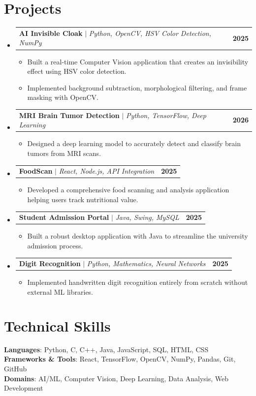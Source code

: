 \documentclass[letterpaper,11pt]{article}
\makeatletter
\newcommand{\resumeItem}[1]{
  \item\small{
    {#1 \vspace{-2pt}}
  }
}
\newcommand{\resumeProjectHeading}[2]{
    \item
    \begin{tabular*}{1.0\textwidth}{l@{\extracolsep{\fill}}r}
      \small#1 & \textbf{\small #2} \\
    \end{tabular*}\vspace{-7pt}
}
\newcommand{\resumeSubHeadingListStart}{\begin{itemize}[leftmargin=0.0in, label={}]}
\newcommand{\resumeSubHeadingListEnd}{\end{itemize}}
\newcommand{\resumeItemListStart}{\begin{itemize}}
\newcommand{\resumeItemListEnd}{\end{itemize}\vspace{-5pt}}
\makeatother
\begin{document}
\section{Projects}
    \resumeSubHeadingListStart
      \resumeProjectHeading
          {\textbf{AI Invisible Cloak} $|$ \emph{Python, OpenCV, HSV Color Detection, NumPy}}{2025}
          \resumeItemListStart
            \resumeItem{Built a real-time Computer Vision application that creates an invisibility effect using HSV color detection.}
            \resumeItem{Implemented background subtraction, morphological filtering, and frame masking with OpenCV.}
          \resumeItemListEnd
      \resumeProjectHeading
          {\textbf{MRI Brain Tumor Detection} $|$ \emph{Python, TensorFlow, Deep Learning}}{2026}
          \resumeItemListStart
            \resumeItem{Designed a deep learning model to accurately detect and classify brain tumors from MRI scans.}
          \resumeItemListEnd
      \resumeProjectHeading
          {\textbf{FoodScan} $|$ \emph{React, Node.js, API Integration}}{2025}
          \resumeItemListStart
            \resumeItem{Developed a comprehensive food scanning and analysis application helping users track nutritional value.}
          \resumeItemListEnd
      \resumeProjectHeading
          {\textbf{Student Admission Portal} $|$ \emph{Java, Swing, MySQL}}{2025}
          \resumeItemListStart
            \resumeItem{Built a robust desktop application with Java to streamline the university admission process.}
          \resumeItemListEnd
      \resumeProjectHeading
          {\textbf{Digit Recognition} $|$ \emph{Python, Mathematics, Neural Networks}}{2025}
          \resumeItemListStart
            \resumeItem{Implemented handwritten digit recognition entirely from scratch without external ML libraries.}
          \resumeItemListEnd
    \resumeSubHeadingListEnd


\section{Technical Skills}
 \begin{itemize}[leftmargin=0.15in, label={}]
    \small{\item{
     \textbf{Languages}{: Python, C, C++, Java, JavaScript, SQL, HTML, CSS} \\
     \textbf{Frameworks \& Tools}{: React, TensorFlow, OpenCV, NumPy, Pandas, Git, GitHub} \\
     \textbf{Domains}{: AI/ML, Computer Vision, Deep Learning, Data Analysis, Web Development}
    }}
 \end{itemize}
\end{document}
